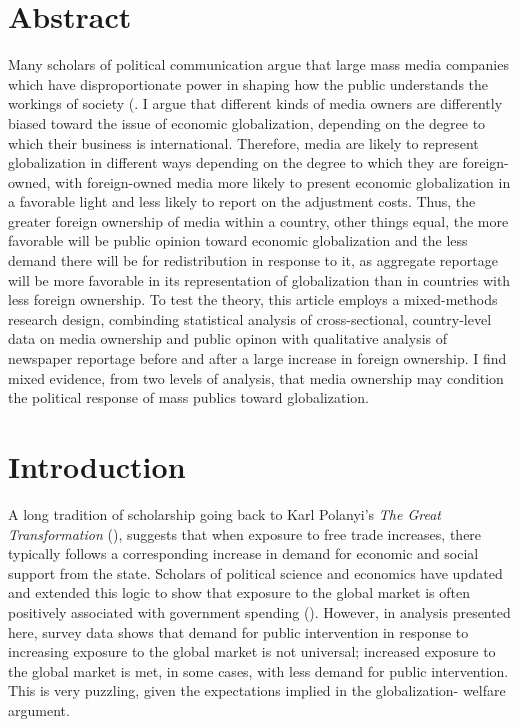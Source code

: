 \documentclass[12pt]{report}
\begin{document}
\section{Abstract}

Many scholars of political communication argue that large mass media companies which have disproportionate power in shaping how the public understands the workings of society (\citealt{Baker:2006te,Bagdikian:1980ci,Ben:1990tw}. I argue that different kinds of media owners are differently biased toward the issue of economic globalization, depending on the degree to which their business is international. Therefore, media are likely to represent globalization in different ways depending on the degree to which they are foreign-owned, with foreign-owned media more likely to present economic globalization in a favorable light and less likely to report on the adjustment costs. Thus, the greater foreign ownership of media within a country, other things equal, the more favorable will be public opinion toward economic globalization and the less demand there will be for redistribution in response to it, as aggregate reportage will be more favorable in its representation of globalization than in countries with less foreign ownership. To test the theory, this article employs a mixed-methods research design, combinding statistical analysis of cross-sectional, country-level data on media ownership and public opinon with qualitative analysis of newspaper reportage before and after a large increase in foreign ownership. I find mixed evidence, from two levels of analysis, that media ownership may condition the political response of mass publics toward globalization.

\section{Introduction}

A long tradition of scholarship going back to Karl Polanyi's \emph{The Great Transformation}
(\citeyear{Polanyi:2001vc}), suggests that when exposure to free trade increases, there typically
follows a corresponding increase in demand for economic and social support from the state. Scholars
of political science and economics have updated and extended this logic to show that exposure to the
global market is often positively associated with government spending (\citealt{Adsera:2002vt,
Cameron:1978vb, Garrett:1998wl,Rodrik:1998te}). However, in analysis presented here, survey data
shows that demand for public intervention in response to increasing exposure to the global market is
not universal; increased exposure to the global market is met, in some cases, with less demand for
public intervention. This is very puzzling, given the expectations implied in the globalization-
welfare argument.
\end{document}
